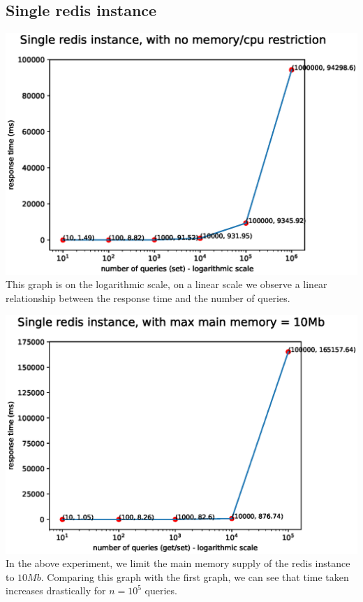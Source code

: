 \documentclass[11pt]{article}
\begin{document}
\subsection*{Single redis instance}
\includegraphics[width=\textwidth]{fig1.eps}
This graph is on the logarithmic scale, on a linear scale we observe a linear
relationship between the response time and the number of queries.

\includegraphics[width=\textwidth]{fig2.eps}
In the above experiment, we limit the main memory supply of the
redis instance to $10Mb$. Comparing this graph with the first graph,
we can see that time taken increases drastically for $n=10^5$ queries.
\end{document}
